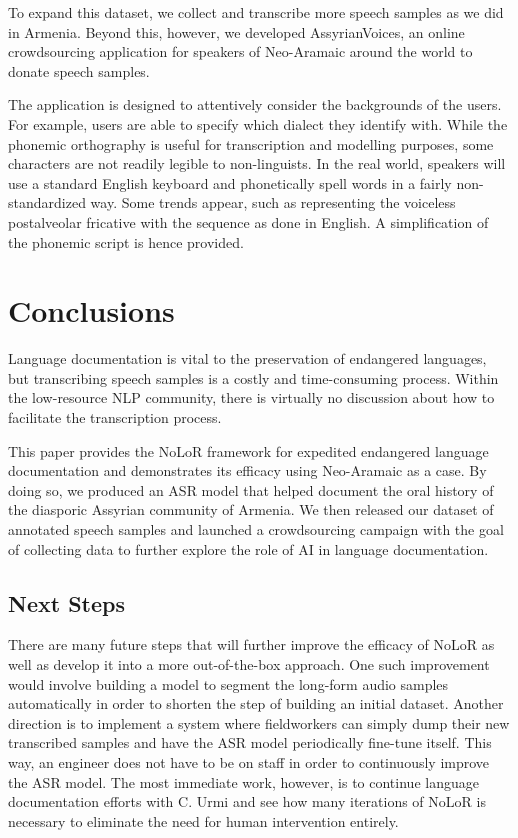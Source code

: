 \documentclass[letterpaper]{article} %
\begin{document}
To expand this dataset, we collect and transcribe more speech samples as we did in Armenia. Beyond this, however, we developed AssyrianVoices, an online crowdsourcing application for speakers of Neo-Aramaic around the world to donate speech samples.

The application is designed to attentively consider the backgrounds of the users. For example, users are able to specify which dialect they identify with. While the phonemic orthography is useful for transcription and modelling purposes, some characters are not readily legible to non-linguists. In the real world, speakers will use a standard English keyboard and phonetically spell words in a fairly non-standardized way. Some trends appear, such as representing the voiceless postalveolar fricative \textipa{[\v s]} with the sequence  as done in English. A simplification of the phonemic script is hence provided.

\section{Conclusions}

Language documentation is vital to the preservation of endangered languages, but transcribing speech samples is a costly and time-consuming process. Within the low-resource NLP community, there is virtually no discussion about how to facilitate the transcription process.

This paper provides the NoLoR framework for expedited endangered language documentation and demonstrates its efficacy using Neo-Aramaic as a case. By doing so, we produced an ASR model that helped document the oral history of the diasporic Assyrian community of Armenia. We then released our dataset of annotated speech samples and launched a crowdsourcing campaign with the goal of collecting data to further explore the role of AI in language documentation.


\subsection{Next Steps}

There are many future steps that will further improve the efficacy of NoLoR as well as develop it into a more out-of-the-box approach. One such improvement would involve building a model to segment the long-form audio samples automatically in order to shorten the step of building an initial dataset. Another direction is to implement a system where fieldworkers can simply dump their new transcribed samples and have the ASR model periodically fine-tune itself. This way, an engineer does not have to be on staff in order to continuously improve the ASR model. The most immediate work, however, is to continue language documentation efforts with C. Urmi and see how many iterations of NoLoR is necessary to eliminate the need for human intervention entirely.
\end{document}
